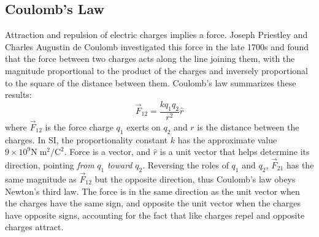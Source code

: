 \documentclass[a4paper]{article}
\begin{document}
\subsection{Coulomb's Law}
Attraction and repulsion of electric charges implies a force. Joseph Priestley and Charles Augustin de Coulomb investigated this force in the late 1700s and found that the force between two charges acts along the line joining them, with the magnitude proportional to the product of the charges and inversely proportional to the square of the distance between them. Coulomb's law summarizes these results:
\begin{equation}
    \vec{F}_{12} = \frac{kq_1q_2}{r^2}\hat{r}
\end{equation}
where $\vec{F}_{12}$ is the force charge $q_1$ exerts on $q_2$ and $r$ is the distance between the charges. In SI, the proportionality constant $k$ has the approximate value $9 \times 10^9 \text{N}\; \text{m}^2/\text{C}^2$. Force is a vector, and $\hat{r}$ is a unit vector that helps determine its direction, pointing \textit{from} $q_1$ \textit{toward} $q_2$. Reversing the roles of $q_1$ and $q_2$, $\vec{F}_{21}$ has the same magnitude as $\vec{F}_{12}$ but the opposite direction, thus Coulomb's law obeys Newton's third law. The force is in the same direction as the unit vector when the charges have the same sign, and opposite the unit vector when the charges have opposite signs, accounting for the fact that like charges repel and opposite charges attract.
\begin{center}
    \hspace{15mm}
\end{center}
\end{document}
